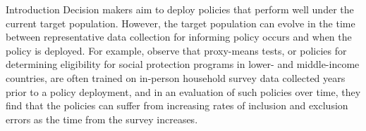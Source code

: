 \documentclass{article}
\theoremstyle{definition}
\newtheorem{exam}{Example}
\theoremstyle{plain}
\theoremstyle{remark}
\begin{document}



\begin{section}{Introduction}
Decision makers aim to deploy policies that perform well under the current target population. However, the target population can evolve in the time between representative data collection for informing policy occurs and when the policy is deployed. For example, \citet{aiken2023moving} observe that proxy-means tests, or policies for determining eligibility for social protection programs in lower- and middle-income countries, are often trained on in-person household survey data collected years prior to a policy deployment, and in an evaluation of such policies over time, they find that the policies can suffer from increasing rates of inclusion and exclusion errors as the time from the survey increases.




\end{section}
\end{document}

